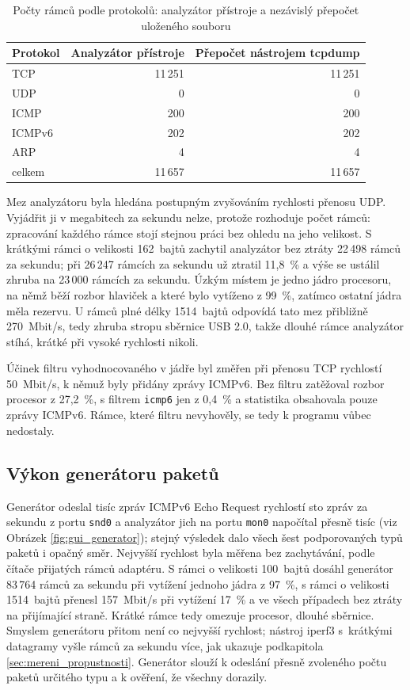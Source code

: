 \begin{table}[htbp]
    \caption{Počty rámců podle protokolů: analyzátor přístroje a nezávislý přepočet uloženého souboru}
    \label{tab:presnost}
    \centering
    \begin{tabular}{lrr}
        \hline
        Protokol & Analyzátor přístroje & Přepočet nástrojem tcpdump \\
        \hline
        TCP & 11\,251 & 11\,251 \\
        UDP & 0 & 0 \\
        ICMP & 200 & 200 \\
        ICMPv6 & 202 & 202 \\
        ARP & 4 & 4 \\
        celkem & 11\,657 & 11\,657 \\
        \hline
    \end{tabular}
\end{table}

Mez analyzátoru byla hledána postupným zvyšováním rychlosti přenosu UDP. Vyjádřit ji v megabitech za sekundu nelze, protože rozhoduje počet rámců: zpracování každého rámce stojí stejnou práci bez ohledu na jeho velikost. S krátkými rámci o velikosti 162~bajtů zachytil analyzátor bez ztráty 22\,498 rámců za sekundu; při 26\,247 rámcích za sekundu už ztratil 11,8~\% a výše se ustálil zhruba na 23\,000 rámcích za sekundu. Úzkým místem je jedno jádro procesoru, na němž běží rozbor hlaviček a které bylo vytíženo z 99~\%, zatímco ostatní jádra měla rezervu. U rámců plné délky 1514~bajtů odpovídá tato mez přibližně 270~Mbit/s, tedy zhruba stropu sběrnice USB 2.0, takže dlouhé rámce analyzátor stíhá, krátké při vysoké rychlosti nikoli.

Účinek filtru vyhodnocovaného v jádře byl změřen při přenosu TCP rychlostí 50~Mbit/s, k němuž byly přidány zprávy ICMPv6. Bez filtru zatěžoval rozbor procesor z 27,2~\%, s filtrem \texttt{icmp6} jen z 0,4~\% a statistika obsahovala pouze zprávy ICMPv6. Rámce, které filtru nevyhověly, se tedy k programu vůbec nedostaly.

\subsection{Výkon generátoru paketů}
\label{sec:overeni_generatoru}

Generátor odeslal tisíc zpráv ICMPv6 Echo Request rychlostí sto zpráv za sekundu z portu \texttt{snd0} a analyzátor jich na portu \texttt{mon0} napočítal přesně tisíc (viz Obrázek \ref{fig:gui_generator}); stejný výsledek dalo všech šest podporovaných typů paketů i opačný směr. Nejvyšší rychlost byla měřena bez zachytávání, podle čítače přijatých rámců adaptéru. S rámci o velikosti 100~bajtů dosáhl generátor 83\,764 rámců za sekundu při vytížení jednoho jádra z 97~\%, s rámci o velikosti 1514~bajtů přenesl 157~Mbit/s při vytížení 17~\% a ve všech případech bez ztráty na přijímající straně. Krátké rámce tedy omezuje procesor, dlouhé sběrnice. Smyslem generátoru přitom není co nejvyšší rychlost; nástroj iperf3 s~krátkými datagramy vyšle rámců za sekundu více, jak ukazuje podkapitola \ref{sec:mereni_propustnosti}. Generátor slouží k odeslání přesně zvoleného počtu paketů určitého typu a k ověření, že všechny dorazily.

